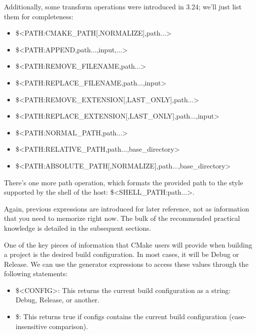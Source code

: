 Additionally, some transform operations were introduced in 3.24; we’ll just list them for completeness:

\begin{itemize}
\item
\$<PATH:CMAKE\_PATH[,NORMALIZE],path...>

\item
\$<PATH:APPEND,path...,input,...>

\item
\$<PATH:REMOVE\_FILENAME,path...>

\item
\$<PATH:REPLACE\_FILENAME,path...,input>

\item
\$<PATH:REMOVE\_EXTENSION[,LAST\_ONLY],path...>

\item
\$<PATH:REPLACE\_EXTENSION[,LAST\_ONLY],path...,input>

\item
\$<PATH:NORMAL\_PATH,path...>

\item
\$<PATH:RELATIVE\_PATH,path...,base\_directory>

\item
\$<PATH:ABSOLUTE\_PATH[,NORMALIZE],path...,base\_directory>
\end{itemize}

There’s one more path operation, which formats the provided path to the style supported by the shell of the host: \$<SHELL\_PATH:path...>.

Again, previous expressions are introduced for later reference, not as information that you need to memorize right now. The bulk of the recommended practical knowledge is detailed in the subsequent sections.



One of the key pieces of information that CMake users will provide when building a project is the desired build configuration. In most cases, it will be Debug or Release. We can use the generator expressions to access these values through the following statements:

\begin{itemize}
\item
\$<CONFIG>: This returns the current build configuration as a string: Debug, Release, or another.

\item
\$<CONFIG:configs>: This returns true if configs contains the current build configuration (case-insensitive comparison).
\end{itemize}

